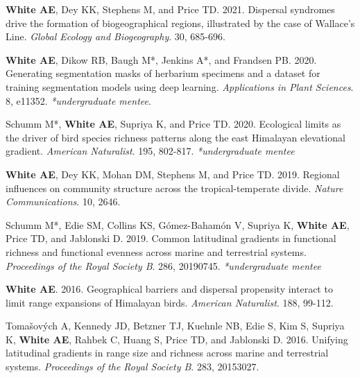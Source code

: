 \documentclass[letterpaper]{article}
\newenvironment{biblist}{%
   \begin{list}{}{%
     \setlength{\labelwidth}{0pt}%
     \setlength{\labelsep}{1em}%
     \setlength{\leftmargin}{2em}%
     \setlength{\itemindent}{-1em}%
   }
}{\end{list}}
\begin{document}
\begin{biblist}
\item \textbf{White AE}, Dey KK, Stephens M, and Price TD. 2021. Dispersal syndromes drive the formation of biogeographical regions, illustrated by the case of Wallace's Line. \textit{Global Ecology and Biogeography}. 30, 685-696.

\item \textbf{White AE}, Dikow RB, Baugh M*, Jenkins A*, and Frandsen PB. 2020. Generating segmentation masks of herbarium specimens and a dataset for training segmentation models using deep learning. \textit{Applications in Plant Sciences}. 8, e11352. \textit{*undergraduate mentee}.

\item  Schumm M*, \textbf{White AE}, Supriya K, and Price TD. 2020. Ecological limits as the driver of bird species richness patterns along the east Himalayan elevational gradient. \textit{American Naturalist}. 195, 802-817. \textit{*undergraduate mentee}

\item \textbf{White AE}, Dey KK, Mohan DM, Stephens M, and Price TD. 2019. Regional influences on community structure across the tropical-temperate divide. \textit{Nature Communications}. 10, 2646.

\item  Schumm M*, Edie SM, Collins KS, Gómez-Bahamón V, Supriya K, \textbf{White AE}, Price TD, and Jablonski D. 2019. Common latitudinal gradients in functional richness and functional evenness across marine and terrestrial systems. \textit{Proceedings of the Royal Society B}. 286, 20190745. \textit{*undergraduate mentee}

\item \textbf{White AE}. 2016. Geographical barriers and dispersal propensity interact to limit range expansions of Himalayan birds. \textit{American Naturalist}. 188, 99-112.

\item  Tomašových A, Kennedy JD, Betzner TJ,  Kuehnle NB, Edie S, Kim S, Supriya K, \textbf{White AE}, Rahbek C, Huang S, Price TD, and Jablonski D. 2016. Unifying latitudinal gradients in range size and  richness across marine and terrestrial systems. \textit{Proceedings of the Royal Society B}. 283, 20153027.
\end{biblist}
\end{document}
